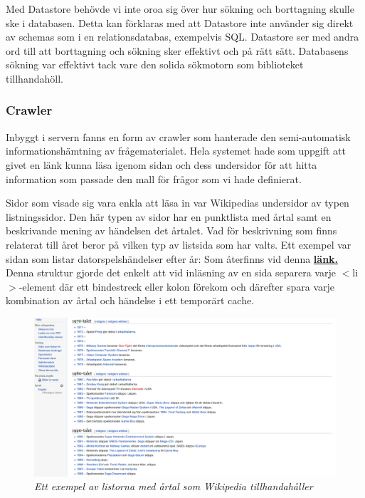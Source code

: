 \documentclass[a4paper, 11pt]{article}
\begin{document}
Med Datastore behövde vi inte oroa sig över hur sökning och borttagning skulle ske i databasen. Detta kan förklaras med att Datastore inte använder sig direkt av schemas som i en relationsdatabas, exempelvis SQL. Datastore ser med andra ord till att borttagning och sökning sker effektivt och på rätt sätt. Databasens sökning var effektivt tack vare den solida sökmotorn som biblioteket tillhandahöll.

\subsubsection{Crawler} \label{crawler}
Inbyggt i servern fanns en form av crawler som hanterade den semi-automatisk informationshämtning av frågematerialet. Hela systemet hade som uppgift att givet en länk kunna läsa igenom sidan och dess undersidor för att hitta information som passade den mall för frågor som vi hade definierat. 

Sidor som visade sig vara enkla att läsa in var Wikipedias undersidor av typen listningssidor. Den här typen av sidor har en punktlista med årtal samt en beskrivande mening av händelsen det årtalet. Vad för beskrivning som finns relaterat till året beror på vilken typ av listsida som har valts. Ett exempel var sidan som listar datorspelshändelser efter år: Som återfinns vid denna  \textbf{\href{http://sv.wikipedia.org/wiki/Lista_\%C3\%B6ver_datorspels\%C3\%A5r}{länk.}} 
Denna struktur gjorde det enkelt att vid inläsning av en sida separera varje $<$li$>$-element där ett bindestreck eller kolon förekom och därefter spara varje kombination av årtal och händelse i ett temporärt cache.

\begin{figure}[H]
	\begin{centering}
	\includegraphics[width=\textwidth]{Listbild} 
	\end{centering}
	\caption{\textit{Ett exempel av listorna med årtal som Wikipedia tillhandahåller}}
\end{figure}
\end{document}
